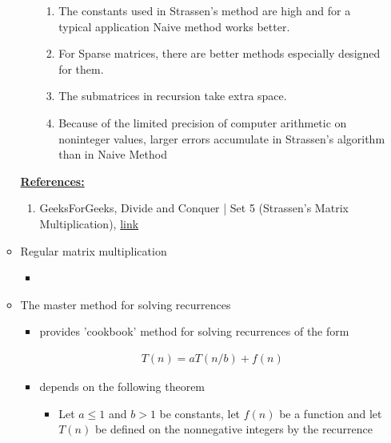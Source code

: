 \documentclass[12pt]{article}
\begin{document}
\begin{enumerate}[1.]
\begin{itemize}
\begin{itemize}
            \begin{enumerate}[1)]
                \item The constants used in Strassen’s method are high and for a typical application Naive method works better.
                \item For Sparse matrices, there are better methods especially designed for them.
                \item The submatrices in recursion take extra space.
                \item Because of the limited precision of computer arithmetic on noninteger values, larger errors accumulate in Strassen’s algorithm than in Naive Method
            \end{enumerate}
        \end{itemize}

        \bigskip

        \underline{\textbf{References:}}

        \bigskip

        \begin{enumerate}[1)]
            \item GeeksForGeeks, Divide and Conquer | Set 5 (Strassen’s Matrix Multiplication), \href{https://www.geeksforgeeks.org/strassens-matrix-multiplication/}{link}
        \end{enumerate}

        \item Regular matrix multiplication

        \begin{itemize}
            \item
        \end{itemize}

        \item The master method for solving recurrences

        \begin{itemize}
            \item provides 'cookbook' method for solving recurrences
            of the form

            \begin{align*}
                T(n) = aT(n/b) + f(n)
            \end{align*}

            \item depends on the following theorem

            \begin{itemize}
                \item Let $a \leq 1$ and $b > 1$ be constants, let $f(n)$ be a function
                and let $T(n)$ be defined on the nonnegative integers by the recurrence


\end{itemize}
\end{itemize}
\end{itemize}
\end{enumerate}
\end{document}
